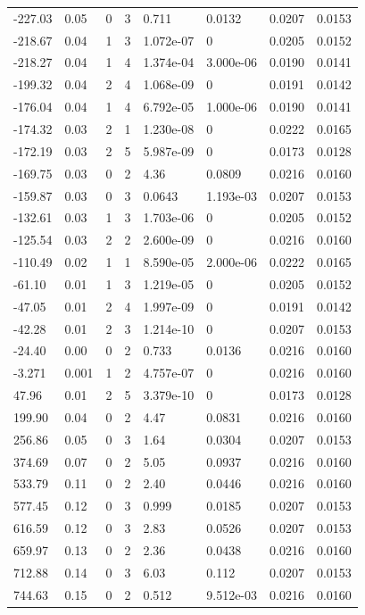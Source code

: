 \documentclass[preview]{standalone}
\begin{document}
{{\begin{tabular}{L{1.2cm}C{1.2cm} C{0.3cm}C{0.5cm} C{1.4cm}C{1.4cm} C{1.4cm}C{1.4cm}}
  -227.03  &  0.05  & 0     &  3 &  0.711  & 0.0132  & 0.0207 &  0.0153   \\ 
  -218.67  &  0.04  & 1     &  3 &  1.072e-07  & 0  & 0.0205 &  0.0152   \\ 
  -218.27  &  0.04  & 1     &  4 &  1.374e-04  & 3.000e-06  & 0.0190 &  0.0141   \\ 
  -199.32  &  0.04  & 2     &  4 &  1.068e-09  & 0  & 0.0191 &  0.0142   \\ 
  -176.04  &  0.04  & 1     &  4 &  6.792e-05  & 1.000e-06  & 0.0190 &  0.0141   \\ 
  -174.32  &  0.03  & 2     &  1 &  1.230e-08  & 0  & 0.0222 &  0.0165   \\ 
  -172.19  &  0.03  & 2     &  5 &  5.987e-09  & 0  & 0.0173 &  0.0128   \\ 
  -169.75  &  0.03  & 0     &  2 &  4.36  & 0.0809  & 0.0216 &  0.0160   \\ 
  -159.87  &  0.03  & 0     &  3 &  0.0643  & 1.193e-03  & 0.0207 &  0.0153   \\ 
  -132.61  &  0.03  & 1     &  3 &  1.703e-06  & 0  & 0.0205 &  0.0152   \\ 
  -125.54  &  0.03  & 2     &  2 &  2.600e-09  & 0  & 0.0216 &  0.0160   \\ 
  -110.49  &  0.02  & 1     &  1 &  8.590e-05  & 2.000e-06  & 0.0222 &  0.0165   \\ 
  -61.10  &  0.01  & 1     &  3 &  1.219e-05  & 0  & 0.0205 &  0.0152   \\ 
  -47.05  &  0.01  & 2     &  4 &  1.997e-09  & 0  & 0.0191 &  0.0142   \\ 
  -42.28  &  0.01  & 2     &  3 &  1.214e-10  & 0  & 0.0207 &  0.0153   \\ 
  -24.40  &  0.00  & 0     &  2 &  0.733  & 0.0136  & 0.0216 &  0.0160   \\ 
  -3.271  &  0.001  & 1     &  2 &  4.757e-07  & 0  & 0.0216 &  0.0160   \\ 
  47.96  &  0.01  & 2     &  5 &  3.379e-10  & 0  & 0.0173 &  0.0128   \\ 
  199.90  &  0.04  & 0     &  2 &  4.47  & 0.0831  & 0.0216 &  0.0160   \\ 
  256.86  &  0.05  & 0     &  3 &  1.64  & 0.0304  & 0.0207 &  0.0153   \\ 
  374.69  &  0.07  & 0     &  2 &  5.05  & 0.0937  & 0.0216 &  0.0160   \\ 
  533.79  &  0.11  & 0     &  2 &  2.40  & 0.0446  & 0.0216 &  0.0160   \\ 
  577.45  &  0.12  & 0     &  3 &  0.999  & 0.0185  & 0.0207 &  0.0153   \\ 
  616.59  &  0.12  & 0     &  3 &  2.83  & 0.0526  & 0.0207 &  0.0153   \\ 
  659.97  &  0.13  & 0     &  2 &  2.36  & 0.0438  & 0.0216 &  0.0160   \\ 
  712.88  &  0.14  & 0     &  3 &  6.03  & 0.112  & 0.0207 &  0.0153   \\ 
  744.63  &  0.15  & 0     &  2 &  0.512  & 9.512e-03  & 0.0216 &  0.0160   \\ 
\hline 
\end{tabular} 

}}
\end{document}
